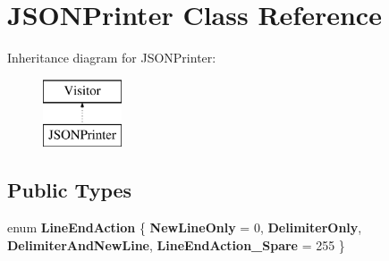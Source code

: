 \section{J\+S\+O\+N\+Printer Class Reference}
\label{classJSONPrinter}
Inheritance diagram for J\+S\+O\+N\+Printer\+:\begin{figure}[H]
\begin{center}
\leavevmode
\includegraphics[height=2.000000cm]{classJSONPrinter}
\end{center}
\end{figure}
\subsection*{Public Types}
\begin{DoxyCompactItemize}
\item 
\mbox{\label{classJSONPrinter_afb4deda90309a782abb375e563580b32}} 
enum {\bfseries Line\+End\+Action} \{ {\bfseries New\+Line\+Only} = 0, 
{\bfseries Delimiter\+Only}, 
{\bfseries Delimiter\+And\+New\+Line}, 
{\bfseries Line\+End\+Action\+\_\+\+Spare} = 255
 \}
\end{DoxyCompactItemize}
